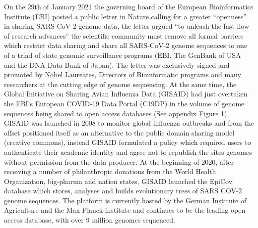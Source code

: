 \documentclass{article}
\begin{document}
On the 29th of January 2021 the governing board of the European
Bioinformatics Institute (EBI) posted a public letter in Nature calling
for a greater ``openness'' in sharing SARS-CoV-2 genome data, the letter
argued ``to unleash the fast flow of research advances'' the scientific
community must remove all formal barriers which restrict data sharing
and share all SARS-CoV-2 genome sequences to one of a triad of state
genomic surveillance programs (EBI, The GenBank of USA and the DNA Data
Bank of Japan). The letter was exclusively signed and promoted by Nobel
Laureates, Directors of Bioinformatic programs and many researchers at
the cutting edge of genome sequencing. At the same time, the Global
Initiative on Sharing Avian Influenza Data (GISAID) had just overtaken
the EBI's European COVID-19 Data Portal (C19DP) in the volume of genome
sequences being shared to open access databases (See appendix Figure 1).
GISAID was launched in 2008 to monitor global influenza outbreaks and
from the offset positioned itself as an alternative to the public domain
sharing model (creative commons), instead GISAID formulated a policy
which required users to authenticate their academic identity and agree
not to republish the sites genomes without permission from the data
producer. At the beginning of 2020, after receiving a number of
philanthropic donations from the World Health Organization, big-pharma
and nation states, GISAID launched the EpiCov database which stores,
analyses and builds evolutionary trees of SARS COV-2 genome sequences.
The platform is currently hosted by the German Institute of Agriculture
and the Max Planck institute and continues to be the leading open access
database, with over 9 million genomes sequenced.
\end{document}
